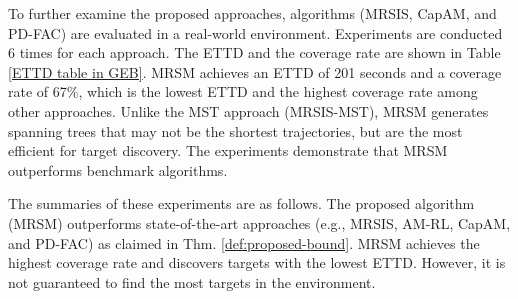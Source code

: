 To further examine the proposed approaches, algorithms (MRSIS\cite{li2024mrsis}, CapAM\cite{paull2022learning}, and PD-FAC\cite{sheng2022pd}) are evaluated in a real-world environment.
Experiments are conducted 6 times for each approach.
The ETTD and the coverage rate are shown in Table \ref{ETTD table in GEB}.
MRSM achieves an ETTD of 201 seconds and a coverage rate of 67\%, which is the lowest ETTD and the highest coverage rate among other approaches.
Unlike the MST approach (MRSIS-MST\cite{li2024mrsis}), MRSM generates spanning trees that may not be the shortest trajectories, but are the most efficient for target discovery.
The experiments demonstrate that MRSM outperforms benchmark algorithms.

The summaries of these experiments are as follows.
The proposed algorithm (MRSM) outperforms state-of-the-art approaches (e.g., MRSIS\cite{li2024mrsis}, AM-RL\cite{kool2018attention}, CapAM\cite{paull2022learning}, and PD-FAC\cite{sheng2022pd}) as claimed in Thm. \ref{def:proposed-bound}.
MRSM achieves the highest coverage rate and discovers targets with the lowest ETTD.
However, it is not guaranteed to find the most targets in the environment.


